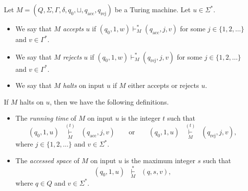 \begin{definition}
  Let $M = (Q, \Sigma, \Gamma, \delta, q_0, \sqcup, q_\text{acc},
  q_\text{rej})$ be a Turing machine.
  Let $u \in \Sigma^*$.
  \begin{itemize}
    \item We say that $M$ \emph{accepts} $u$ if
    $(q_0, 1, w) \vdash_M^* (q_\text{acc}, j, v)$ for some
    $j \in \{1, 2, \dots\}$ and $v \in \Gamma^*$.
    \item We say that $M$ \emph{rejects} $u$ if
    $(q_0, 1, w) \vdash_M^* (q_\text{rej}, j, v)$ for some
    $j \in \{1, 2, \dots\}$ and $v \in \Gamma^*$.
    \item We say that $M$ \emph{halts} on input $u$ if $M$ either accepts or
    rejects $u$.
  \end{itemize}
  If $M$ halts on $u$, then we have the following definitions.
  \begin{itemize}
    \item The \emph{running time} of $M$ on input $u$ is the integer $t$ such
    that
    \begin{equation*}
      (q_0, 1, u)
      \;\; \mathop\vdash\limits_{M}^{(t)} \;\;
      (q_\text{acc}, j, v)
      \qquad \text{or} \qquad
      (q_0, 1, u)
      \;\; \mathop\vdash\limits_{M}^{(t)} \;\;
      (q_\text{rej}, j, v),
    \end{equation*}
    where $j \in \{1, 2, \dots\}$ and $v \in \Sigma^*$.
    \item The \emph{accessed space} of $M$ on input $u$ is the maximum integer
    $s$ such that
    \begin{equation*}
      (q_0, 1, u)
      \;\; \mathop\vdash\limits_{M}^* \;\;
      (q, s, v),
    \end{equation*}
    where $q \in Q$ and $v \in \Sigma^*$.
  \end{itemize}
\end{definition}


